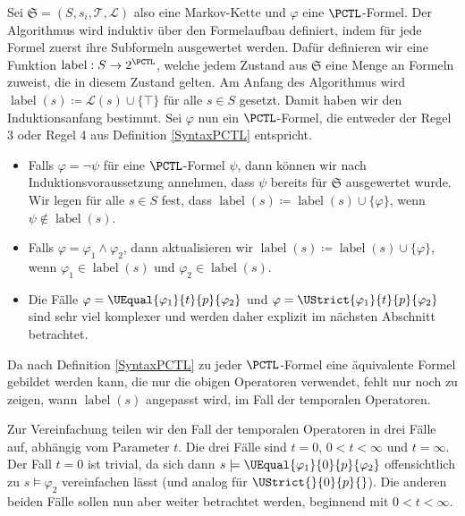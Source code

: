 Sei $\mathfrak{S}=(S,s_i,\mathcal{T},\mathcal{L})$ also eine Markov-Kette und $\varphi$ eine $\PCTL$-Formel. 
Der Algorithmus wird induktiv über den Formelaufbau definiert, indem für jede Formel zuerst ihre Subformeln ausgewertet werden. 
Dafür definieren wir eine Funktion $\operatorname{label}:S\to 2^\PCTL$, welche jedem Zustand aus $\mathfrak{S}$ eine Menge an Formeln zuweist, die in diesem Zustand gelten.
Am Anfang des Algorithmus wird $\operatorname{label}(s)\coloneqq\mathcal{L}(s)\cup\{\top\}$ für alle $s\in S$ gesetzt. Damit haben wir den Induktionsanfang bestimmt. Sei $\varphi$ nun ein $\PCTL$-Formel, die entweder der Regel 3 oder Regel 4 aus Definition \ref{SyntaxPCTL} entspricht.
\begin{itemize}
	\item Falls $\varphi=\neg\psi$ für eine $\PCTL$-Formel $\psi$, dann können wir nach Induktionsvoraussetzung annehmen, dass $\psi$ bereits für $\mathfrak{S}$ ausgewertet wurde. Wir legen für alle $s\in S$ fest, dass $\operatorname{label}(s)\coloneqq \operatorname{label}(s) \cup\{\varphi\}$, wenn $\psi \notin \operatorname{label}(s)$.
	\item Falls $\varphi = \varphi_1\land\varphi_2$, dann aktualisieren wir $\operatorname{label}(s)\coloneqq \operatorname{label}(s) \cup \{\varphi\}$, wenn $\varphi_1\in \operatorname{label}(s)$ und $\varphi_2\in \operatorname{label}(s)$.
	\item Die Fälle $\varphi = \UEqual{\varphi_1}{t}{p}{\varphi_2}$ und $\varphi = \UStrict{\varphi_1}{t}{p}{\varphi_2}$ sind sehr viel komplexer und werden daher explizit im nächsten Abschnitt betrachtet.
\end{itemize}
Da nach Definition \ref{SyntaxPCTL} zu jeder $\PCTL$-Formel eine äquivalente Formel gebildet werden kann, die nur die obigen Operatoren verwendet, fehlt nur noch zu zeigen, wann $\operatorname{label}(s)$ angepasst wird, im Fall der temporalen Operatoren. \cite{hansson1994logic}

Zur Vereinfachung teilen wir den Fall der temporalen Operatoren in drei Fälle auf, abhängig vom Parameter $t$. Die drei Fälle sind $t=0$, $0<t<\infty$ und $t=\infty$.
Der Fall $t=0$ ist trivial, da sich dann $s \models \UEqual{\varphi_1}{0}{p}{\varphi_2}$ offensichtlich zu $s \models \varphi_2$ vereinfachen lässt (und analog für $\UStrict{}{0}{p}{}$).
Die anderen beiden Fälle sollen nun aber weiter betrachtet werden, beginnend mit $0<t<\infty$.

